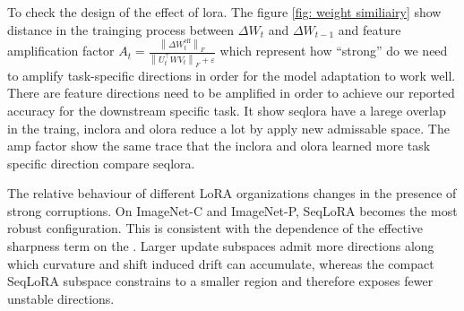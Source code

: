 \documentclass{article}
\theoremstyle{plain}
\theoremstyle{definition}
\theoremstyle{remark}
\begin{document}

To check the design of the effect of lora. The figure \ref{fig: weight similiairy} show distance in the trainging process between $\Delta W_t$ and $\Delta W_{t-1}$ and feature amplification factor $
A_t =
\frac{\left\lVert \Delta W^{\mathrm{eff}}_{t}\right\rVert_F}
{\left\lVert U_{t}^{\top} W V_{t}\right\rVert_F+\varepsilon}
$ which represent how  “strong” do we need to amplify  task-specific directions in order for the model adaptation to work well.  There are  feature directions need to be amplified in order to achieve our reported accuracy for the downstream specific task. It show seqlora have a larege overlap in the traing,  inclora and olora reduce a lot by apply new admissable space. The amp factor show the same trace that the inclora and olora learned more task specific direction compare seqlora.

The relative behaviour of different LoRA organizations changes in the presence of strong corruptions. On
ImageNet-C and ImageNet-P, SeqLoRA becomes the most robust configuration. This is consistent with the dependence of the effective sharpness term on the . Larger update subspaces admit more directions along
which curvature and shift induced drift can accumulate, whereas the compact SeqLoRA subspace constrains to a smaller region and therefore exposes fewer unstable directions.


\end{document}
